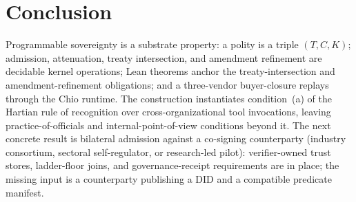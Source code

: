 \section{Conclusion}

Programmable sovereignty is a substrate property: a polity is a triple $(T, C, K)$; admission, attenuation, treaty intersection, and amendment refinement are decidable kernel operations; Lean theorems anchor the treaty-intersection and amendment-refinement obligations; and a three-vendor buyer-closure replays through the Chio runtime. The construction instantiates condition~(a) of the Hartian rule of recognition over cross-organizational tool invocations, leaving practice-of-officials and internal-point-of-view conditions beyond it. The next concrete result is bilateral admission against a co-signing counterparty (industry consortium, sectoral self-regulator, or research-led pilot): verifier-owned trust stores, ladder-floor joins, and governance-receipt requirements are in place; the missing input is a counterparty publishing a DID and a compatible predicate manifest.
